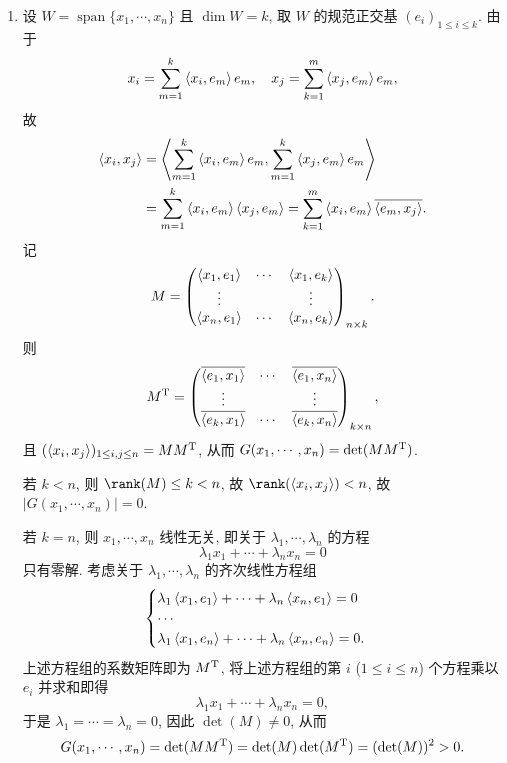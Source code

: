 \begin{enumerate}
\begin{answer}
      \begin{enumerate}
        \item 设 $W=\operatorname{span}\{x_1,\cdots,x_n\}$ 且 $\dim W=k$,
        取 $W$ 的规范正交基 $(e_i)_{1\leq i\leq k}$. 由于
        \[x_i=\sum_{m=1}^k \left\langle x_i,e_m\right\rangle e_m,\quad x_j=\sum_{k=1}^m \left\langle x_j,e_m\right\rangle e_m,\]
        故
        \begin{align*}
            \left\langle x_i,x_j\right\rangle
            &=\left\langle\sum_{m=1}^k \left\langle x_i,e_m\right\rangle e_m,\sum_{m=1}^k \left\langle x_j,e_m\right\rangle e_m\right\rangle \\
            &=\sum_{m=1}^k \left\langle x_i,e_m\right\rangle\left\langle x_j,e_m\right\rangle=\sum_{k=1}^m \left\langle x_i,e_m\right\rangle\overline{\left\langle e_m,x_j\right\rangle}.
        \end{align*}
        记
        \[M=\begin{pmatrix}
            \left\langle x_1,e_1\right\rangle & \cdots & \left\langle x_1,e_k\right\rangle \\
            \vdots            &        & \vdots            \\
            \left\langle x_n,e_1\right\rangle & \cdots & \left\langle x_n,e_k\right\rangle
        \end{pmatrix}_{n\times k}.\]
        则
        \[M^{\mathrm{T}}
        =\begin{pmatrix}
            \overline{\left\langle e_1,x_1\right\rangle} & \cdots & \overline{\left\langle e_1,x_n\right\rangle} \\
            \vdots & & \vdots \\
            \overline{\left\langle e_k,x_1\right\rangle} & \cdots & \overline{\left\langle e_k,x_n\right\rangle} 
        \end{pmatrix}_{k\times n},\]
        且 $(\left\langle x_i,x_j\right\rangle)_{1\leq i,j\leq n}=MM^{\mathrm{T}}$, 从而 $G(x_1,\cdots,x_n)=\det(MM^{\mathrm{T}})$.
    
        若 $k<n$, 则 $\rank(M)\leq k<n$, 故 $\rank(\innerp{x_i}{x_j})<n$, 故 $|G(x_1,\cdots,x_n)|=0$.
    
        若 $k=n$, 则 $x_1,\cdots, x_n$ 线性无关,
        即关于 $\lambda_1,\cdots,\lambda_n$ 的方程
        \[\lambda_1 x_1+\cdots+\lambda_nx_n=0\]
        只有零解. 考虑关于 $\lambda_1,\cdots,\lambda_n$ 的齐次线性方程组
        \[\begin{cases}
            \lambda_1\left\langle x_1,e_1\right\rangle+\cdots+\lambda_n\left\langle x_n,e_1\right\rangle=0 \\
            \cdots \\
            \lambda_1\left\langle x_1,e_n\right\rangle+\cdots+\lambda_n\left\langle x_n,e_n\right\rangle=0.
        \end{cases}\]
        上述方程组的系数矩阵即为 $M^{\mathrm{T}}$, 将上述方程组的第 $i$ ($1\leq i\leq n$) 个方程乘以 $e_i$ 并求和即得
        \[\lambda_1x_1+\cdots+\lambda_nx_n=0,\]
        于是 $\lambda_1=\cdots=\lambda_n=0$, 因此 $\det(M)\neq 0$,
        从而 
        \[G(x_1,\cdots,x_n)=\det(MM^{\mathrm{T}})=\det(M)\det(M^{\mathrm{T}})=(\det(M))^2>0.\]
    

\end{enumerate}
\end{answer}
\end{enumerate}
